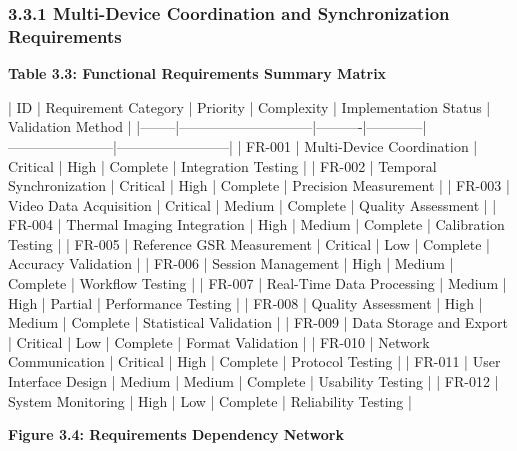 \documentclass[12pt,a4paper]{article}
\begin{document}
\subsubsection{3.3.1 Multi-Device Coordination and Synchronization Requirements}

\textbf{Table 3.3: Functional Requirements Summary Matrix}

| ID     | Requirement Category        | Priority | Complexity | Implementation Status | Validation Method      |
|--------|-----------------------------|----------|------------|-----------------------|------------------------|
| FR-001 | Multi-Device Coordination   | Critical | High       | Complete              | Integration Testing    |
| FR-002 | Temporal Synchronization    | Critical | High       | Complete              | Precision Measurement  |
| FR-003 | Video Data Acquisition      | Critical | Medium     | Complete              | Quality Assessment     |
| FR-004 | Thermal Imaging Integration | High     | Medium     | Complete              | Calibration Testing    |
| FR-005 | Reference GSR Measurement   | Critical | Low        | Complete              | Accuracy Validation    |
| FR-006 | Session Management          | High     | Medium     | Complete              | Workflow Testing       |
| FR-007 | Real-Time Data Processing   | Medium   | High       | Partial               | Performance Testing    |
| FR-008 | Quality Assessment          | High     | Medium     | Complete              | Statistical Validation |
| FR-009 | Data Storage and Export     | Critical | Low        | Complete              | Format Validation      |
| FR-010 | Network Communication       | Critical | High       | Complete              | Protocol Testing       |
| FR-011 | User Interface Design       | Medium   | Medium     | Complete              | Usability Testing      |
| FR-012 | System Monitoring           | High     | Low        | Complete              | Reliability Testing    |

\textbf{Figure 3.4: Requirements Dependency Network}
\end{document}

